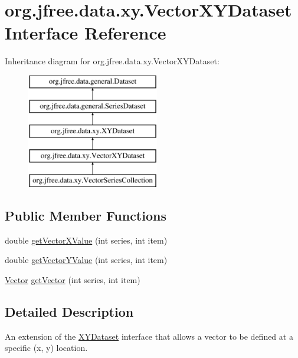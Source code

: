 \hypertarget{interfaceorg_1_1jfree_1_1data_1_1xy_1_1_vector_x_y_dataset}{}\section{org.\+jfree.\+data.\+xy.\+Vector\+X\+Y\+Dataset Interface Reference}
\label{interfaceorg_1_1jfree_1_1data_1_1xy_1_1_vector_x_y_dataset}
Inheritance diagram for org.\+jfree.\+data.\+xy.\+Vector\+X\+Y\+Dataset\+:\begin{figure}[H]
\begin{center}
\leavevmode
\includegraphics[height=5.000000cm]{interfaceorg_1_1jfree_1_1data_1_1xy_1_1_vector_x_y_dataset}
\end{center}
\end{figure}
\subsection*{Public Member Functions}
\begin{DoxyCompactItemize}
\item 
double \mbox{\hyperlink{interfaceorg_1_1jfree_1_1data_1_1xy_1_1_vector_x_y_dataset_a1126d5960a9f446d360f89715d93d209}{get\+Vector\+X\+Value}} (int series, int item)
\item 
double \mbox{\hyperlink{interfaceorg_1_1jfree_1_1data_1_1xy_1_1_vector_x_y_dataset_ac3a14bcfbf867f625abfe605a20d1d54}{get\+Vector\+Y\+Value}} (int series, int item)
\item 
\mbox{\hyperlink{classorg_1_1jfree_1_1data_1_1xy_1_1_vector}{Vector}} \mbox{\hyperlink{interfaceorg_1_1jfree_1_1data_1_1xy_1_1_vector_x_y_dataset_aba926f9aaf6a756befe095ac4b84de0e}{get\+Vector}} (int series, int item)
\end{DoxyCompactItemize}


\subsection{Detailed Description}
An extension of the \mbox{\hyperlink{interfaceorg_1_1jfree_1_1data_1_1xy_1_1_x_y_dataset}{X\+Y\+Dataset}} interface that allows a vector to be defined at a specific (x, y) location.

